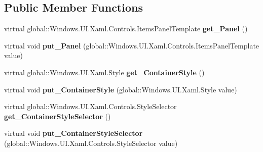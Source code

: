 \subsection*{Public Member Functions}
\begin{DoxyCompactItemize}
\item 
\mbox{\label{class_windows_1_1_u_i_1_1_xaml_1_1_controls_1_1_group_style_a3c268ef18089368deaadd594eb77b93f}} 
virtual global\+::\+Windows.\+U\+I.\+Xaml.\+Controls.\+Items\+Panel\+Template {\bfseries get\+\_\+\+Panel} ()
\item 
\mbox{\label{class_windows_1_1_u_i_1_1_xaml_1_1_controls_1_1_group_style_abdff045e22bd9e3c822ebdbb721ca0cd}} 
virtual void {\bfseries put\+\_\+\+Panel} (global\+::\+Windows.\+U\+I.\+Xaml.\+Controls.\+Items\+Panel\+Template value)
\item 
\mbox{\label{class_windows_1_1_u_i_1_1_xaml_1_1_controls_1_1_group_style_aca3b627e4f154a3c71dfb861be9a9d70}} 
virtual global\+::\+Windows.\+U\+I.\+Xaml.\+Style {\bfseries get\+\_\+\+Container\+Style} ()
\item 
\mbox{\label{class_windows_1_1_u_i_1_1_xaml_1_1_controls_1_1_group_style_abb8477a846bdaf75ee930b67c2f7d88d}} 
virtual void {\bfseries put\+\_\+\+Container\+Style} (global\+::\+Windows.\+U\+I.\+Xaml.\+Style value)
\item 
\mbox{\label{class_windows_1_1_u_i_1_1_xaml_1_1_controls_1_1_group_style_a2de61fd35bfccb41a006bc9635ed88ec}} 
virtual global\+::\+Windows.\+U\+I.\+Xaml.\+Controls.\+Style\+Selector {\bfseries get\+\_\+\+Container\+Style\+Selector} ()
\item 
\mbox{\label{class_windows_1_1_u_i_1_1_xaml_1_1_controls_1_1_group_style_a87a315fbb444d0a30f115de2f3729cc7}} 
virtual void {\bfseries put\+\_\+\+Container\+Style\+Selector} (global\+::\+Windows.\+U\+I.\+Xaml.\+Controls.\+Style\+Selector value)
\item 
\mbox{\label{class_windows_1_1_u_i_1_1_xaml_1_1_controls_1_1_group_style_af2b42ad3678973b6c5ffc2da772855d9}} 

\end{DoxyCompactItemize}
